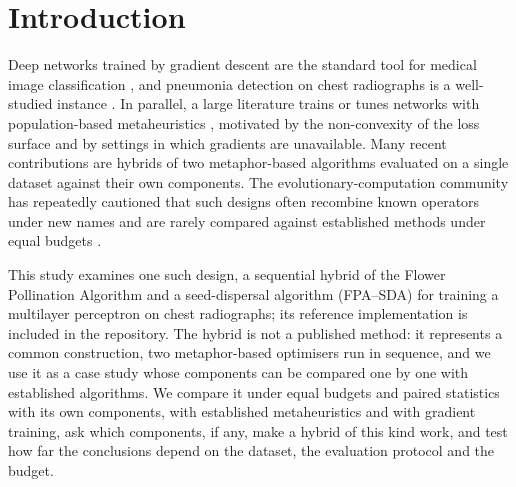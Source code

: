 \documentclass[10pt,letterpaper]{article}
\begin{document}
\linenumbers

\section{Introduction}\label{sec:intro}

Deep networks trained by gradient descent are the standard tool for medical image classification \citep{lecun2015deep,litjens2017survey}, and pneumonia detection on chest radiographs is a well-studied instance \citep{kermany2018,rajpurkar2017chexnet}. In parallel, a large literature trains or tunes networks with population-based metaheuristics \citep{ojha2017metaheuristic,stanley2019neuroevolution}, motivated by the non-convexity of the loss surface and by settings in which gradients are unavailable. Many recent contributions are hybrids of two metaphor-based algorithms evaluated on a single dataset against their own components. The evolutionary-computation community has repeatedly cautioned that such designs often recombine known operators under new names and are rarely compared against established methods under equal budgets \citep{sorensen2015metaphor,aranha2022callforaction,camacho2023exposing}.

This study examines one such design, a sequential hybrid of the Flower Pollination Algorithm \citep{yang2012fpa} and a seed-dispersal algorithm (FPA--SDA) for training a multilayer perceptron on chest radiographs; its reference implementation is included in the repository. The hybrid is not a published method: it represents a common construction, two metaphor-based optimisers run in sequence, and we use it as a case study whose components can be compared one by one with established algorithms. We compare it under equal budgets and paired statistics with its own components, with established metaheuristics and with gradient training, ask which components, if any, make a hybrid of this kind work, and test how far the conclusions depend on the dataset, the evaluation protocol and the budget.
\end{document}
